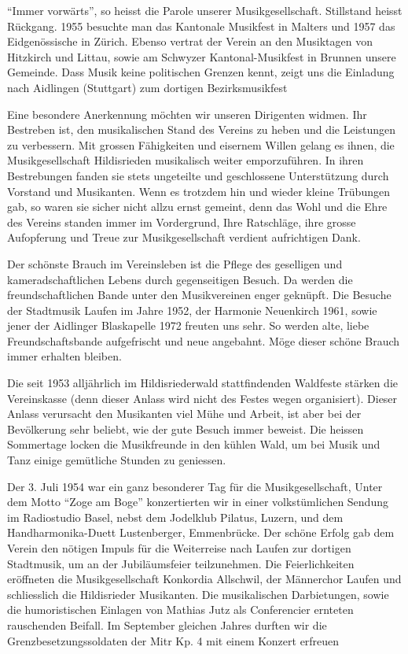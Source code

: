 \begin{history}

    \enquote{Immer vorwärts}, so heisst die Parole unserer Musikgesellschaft.
    Stillstand heisst Rückgang. 1955 besuchte man das Kantonale Musikfest in
    Malters und 1957 das Eidgenössische in Zürich. Ebenso vertrat der Verein an
    den Musiktagen von Hitzkirch und Littau, sowie am Schwyzer
    Kantonal-Musikfest in Brunnen unsere Gemeinde. Dass Musik keine politischen
    Grenzen kennt, zeigt uns die Einladung nach Aidlingen (Stuttgart) zum
    dortigen Bezirksmusikfest

    Eine besondere Anerkennung möchten wir unseren Dirigenten widmen. Ihr
    Bestreben ist, den musikalischen Stand des Vereins zu heben und die
    Leistungen zu verbessern. Mit grossen Fähigkeiten und eisernem Willen gelang
    es ihnen, die Musikgesellschaft Hildisrieden musikalisch weiter
    emporzuführen. In ihren Bestrebungen fanden sie stets ungeteilte und
    geschlossene Unterstützung durch Vorstand und Musikanten. Wenn es trotzdem
    hin und wieder kleine Trübungen gab, so waren sie sicher nicht allzu ernst
    gemeint, denn das Wohl und die Ehre des Vereins standen immer im
    Vordergrund, Ihre Ratschläge, ihre grosse Aufopferung und Treue zur
    Musikgesellschaft verdient aufrichtigen Dank.

    Der schönste Brauch im Vereinsleben ist die Pflege des geselligen und
    kameradschaftlichen Lebens durch gegenseitigen Besuch. Da werden die
    freundschaftlichen Bande unter den Musikvereinen enger geknüpft. Die Besuche
    der Stadtmusik Laufen im Jahre 1952, der Harmonie Neuenkirch 1961, sowie
    jener der Aidlinger Blaskapelle 1972 freuten uns sehr. So werden alte, liebe
    Freundschaftsbande aufgefrischt und neue angebahnt. Möge dieser schöne
    Brauch immer erhalten bleiben.

    Die seit 1953 alljährlich im Hildisriederwald stattfindenden Waldfeste
    stärken die Vereinskasse (denn dieser Anlass wird nicht des Festes wegen
    organisiert). Dieser Anlass verursacht den Musikanten viel Mühe und Arbeit,
    ist aber bei der Bevölkerung sehr beliebt, wie der gute Besuch immer
    beweist. Die heissen Sommertage locken die Musikfreunde in den kühlen Wald,
    um bei Musik und Tanz einige gemütliche Stunden zu geniessen.

    Der 3. Juli 1954 war ein ganz besonderer Tag für die Musikgesellschaft,
    Unter dem Motto \enquote{Zoge am Boge} konzertierten wir in einer
    volkstümlichen Sendung im Radiostudio Basel, nebst dem Jodelklub Pilatus,
    Luzern, und dem Handharmonika-Duett Lustenberger, Emmenbrücke. Der schöne
    Erfolg gab dem Verein den nötigen Impuls für die Weiterreise nach Laufen zur
    dortigen Stadtmusik, um an der Jubiläumsfeier teilzunehmen. Die
    Feierlichkeiten eröffneten die Musikgesellschaft Konkordia Allschwil, der
    Männerchor Laufen und schliesslich die Hildisrieder Musikanten. Die
    musikalischen Darbietungen, sowie die humoristischen Einlagen von Mathias
    Jutz als Conferencier ernteten rauschenden Beifall. Im September gleichen
    Jahres durften wir die Grenzbesetzungssoldaten der Mitr Kp. 4 mit einem
    Konzert erfreuen


\end{history}
